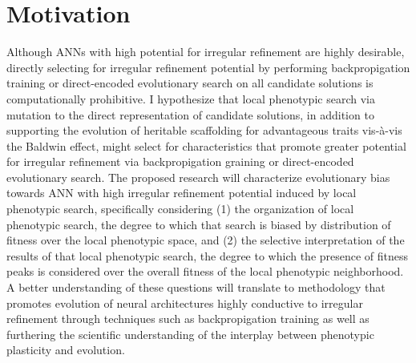 \section{Motivation}

Although ANNs with high potential for irregular refinement are highly desirable, directly selecting for irregular refinement potential by performing backpropigation training or direct-encoded evolutionary search on all candidate solutions is computationally prohibitive.
I hypothesize that local phenotypic search via mutation to the direct representation of candidate solutions, in addition to supporting the evolution of heritable scaffolding for advantageous traits vis-\`{a}-vis the Baldwin effect, might select for characteristics that promote greater potential for irregular refinement via backpropigation graining or direct-encoded evolutionary search.
The proposed research will characterize evolutionary bias towards ANN with high irregular refinement potential induced by local phenotypic search, specifically considering (1) the organization of local phenotypic search, the degree to which that search is biased by distribution of fitness over the local phenotypic space, and (2) the selective interpretation of the results of that local phenotypic search, the degree to which the presence of fitness peaks is considered over the overall fitness of the local phenotypic neighborhood.
A better understanding of these questions will translate to methodology that promotes evolution of neural architectures highly conductive to irregular refinement through techniques such as backpropigation training as well as furthering the scientific understanding of the interplay between phenotypic plasticity and evolution.
